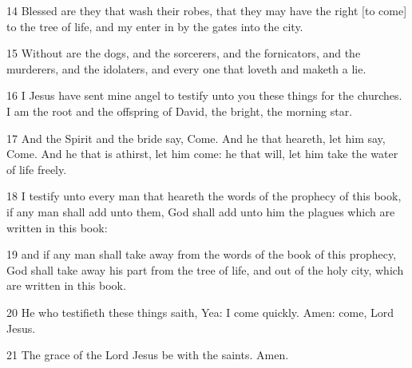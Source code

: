 \par 14 Blessed are they that wash their robes, that they may have the right [to come] to the tree of life, and my enter in by the gates into the city.
\par 15 Without are the dogs, and the sorcerers, and the fornicators, and the murderers, and the idolaters, and every one that loveth and maketh a lie.
\par 16 I Jesus have sent mine angel to testify unto you these things for the churches. I am the root and the offspring of David, the bright, the morning star.
\par 17 And the Spirit and the bride say, Come. And he that heareth, let him say, Come. And he that is athirst, let him come: he that will, let him take the water of life freely.
\par 18 I testify unto every man that heareth the words of the prophecy of this book, if any man shall add unto them, God shall add unto him the plagues which are written in this book:
\par 19 and if any man shall take away from the words of the book of this prophecy, God shall take away his part from the tree of life, and out of the holy city, which are written in this book.
\par 20 He who testifieth these things saith, Yea: I come quickly. Amen: come, Lord Jesus.
\par 21 The grace of the Lord Jesus be with the saints. Amen.


